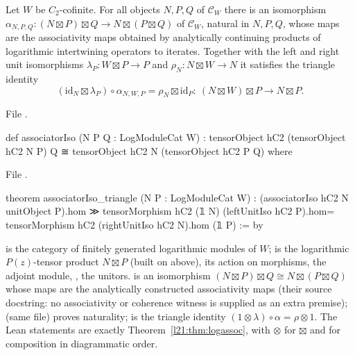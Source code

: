 \begin{theorem}\label{l21:thm:logassoc}
Let $W$ be $C_2$-cofinite. For all objects $N,P,Q$ of $\mathcal C_W$ there is an isomorphism
$\alpha_{N,P,Q}:(N\boxtimes P)\boxtimes Q\to N\boxtimes(P\boxtimes Q)$ of $\mathcal C_W$, natural in $N,P,Q$, whose maps
are the associativity maps obtained by analytically continuing products of logarithmic intertwining operators to
iterates. Together with the left and right unit isomorphisms $\lambda_P:W\boxtimes P\to P$ and $\rho_N:N\boxtimes W\to N$
it satisfies the triangle identity
\begin{equation*}
  (\mathrm{id}_N\boxtimes\lambda_P)\circ\alpha_{N,W,P}=\rho_N\boxtimes\mathrm{id}_P:\ (N\boxtimes W)\boxtimes P\to N\boxtimes P .
\end{equation*}
\end{theorem}
\noindent File .
\begin{leancode}
def associatorIso (N P Q : LogModuleCat W) :
    tensorObject hC2 (tensorObject hC2 N P) Q ≅
      tensorObject hC2 N (tensorObject hC2 P Q) where
\end{leancode}
\noindent File .
\begin{leancode}
theorem associatorIso_triangle (N P : LogModuleCat W) :
    (associatorIso hC2 N unitObject P).hom ≫
      tensorMorphism hC2 (𝟙 N) (leftUnitIso hC2 P).hom=
    tensorMorphism hC2 (rightUnitIso hC2 N).hom (𝟙 P) := by
\end{leancode}

\begin{dictionary}
 is the category of finitely generated logarithmic modules of $W$;  is
the logarithmic $P(z)$-tensor product $N\boxtimes P$ (built on  above),  its
action on morphisms,  the adjoint module, ,  the unitors.
 is an isomorphism $(N\boxtimes P)\boxtimes Q\cong N\boxtimes(P\boxtimes Q)$ whose maps are the
analytically constructed associativity maps (their source docstring: no associativity or coherence witness is supplied as
an extra premise);  (same file) proves naturality;  is the
triangle identity $(1\otimes\lambda)\circ\alpha=\rho\otimes1$. The Lean statements are exactly
Theorem~\ref{l21:thm:logassoc}, with $\otimes$ for $\boxtimes$ and  for composition in diagrammatic order.
\end{dictionary}

